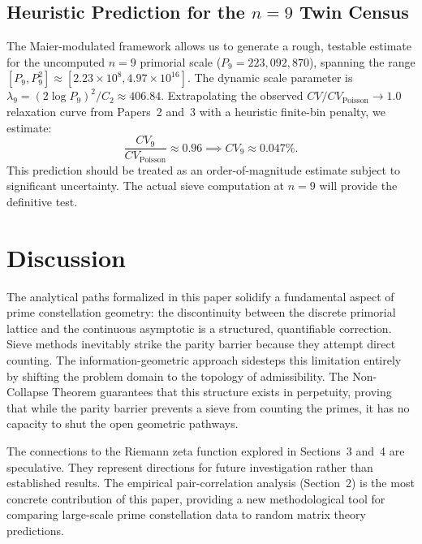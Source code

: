 \documentclass[11pt]{article}
\theoremstyle{remark}
\begin{document}
\subsection{Heuristic Prediction for the $n=9$ Twin Census}
The Maier-modulated framework allows us to generate a rough, testable estimate for the uncomputed $n=9$ primorial scale ($P_9 = 223{,}092{,}870$), spanning the range $[P_9, P_9^2] \approx [2.23 \times 10^8, 4.97 \times 10^{16}]$. The dynamic scale parameter is $\lambda_9 = (2\log P_9)^2 / C_2 \approx 406.84$. Extrapolating the observed $CV/CV_{\mathrm{Poisson}} \to 1.0$ relaxation curve from Papers~2 and~3 with a heuristic finite-bin penalty, we estimate:
\begin{equation}
    \frac{CV_9}{CV_{\text{Poisson}}} \approx 0.96 \implies CV_9 \approx 0.047\%.
\end{equation}
This prediction should be treated as an order-of-magnitude estimate subject to significant uncertainty. The actual sieve computation at $n=9$ will provide the definitive test.

\section{Discussion}
The analytical paths formalized in this paper solidify a fundamental aspect of prime constellation geometry: the discontinuity between the discrete primorial lattice and the continuous asymptotic is a structured, quantifiable correction. Sieve methods inevitably strike the parity barrier because they attempt direct counting. The information-geometric approach sidesteps this limitation entirely by shifting the problem domain to the topology of admissibility. The Non-Collapse Theorem guarantees that this structure exists in perpetuity, proving that while the parity barrier prevents a sieve from counting the primes, it has no capacity to shut the open geometric pathways.

The connections to the Riemann zeta function explored in Sections~3 and~4 are speculative. They represent directions for future investigation rather than established results. The empirical pair-correlation analysis (Section~2) is the most concrete contribution of this paper, providing a new methodological tool for comparing large-scale prime constellation data to random matrix theory predictions.
\end{document}

